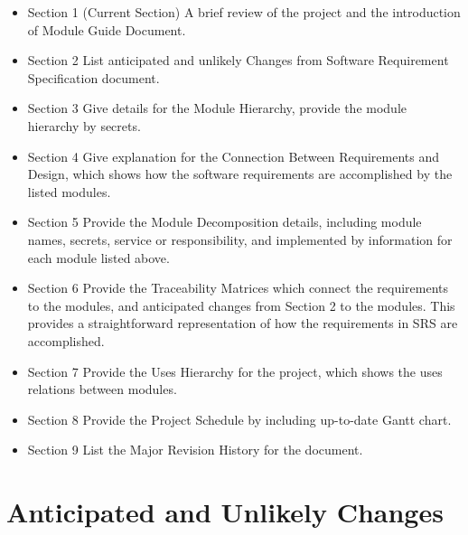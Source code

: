 \documentclass[12,english]{article}
\begin{document}
\begin{itemize}

\item Section 1 \newline (Current Section) A brief review of the project and the introduction of Module Guide Document.

\item Section 2 \newline List anticipated and unlikely Changes from Software Requirement Specification document. 

\item Section 3 \newline Give details for the Module Hierarchy, provide the module hierarchy by secrets. 

\item Section 4 \newline Give explanation for the Connection Between Requirements and Design, which shows how the software requirements are accomplished by the listed modules. 

\item Section 5 \newline Provide the Module Decomposition details, including module names, secrets, service or responsibility, and implemented by information for each module listed above. 

\item Section 6 \newline Provide the Traceability Matrices which connect the requirements to the modules, and anticipated changes from Section 2 to the modules. This provides a straightforward representation of how the requirements in SRS are accomplished.

\item Section 7 \newline Provide the Uses Hierarchy for the project, which shows the uses relations between modules.

\item Section 8 \newline Provide the Project Schedule by including up-to-date Gantt chart.

\item Section 9 \newline List the Major Revision History for the document.
\end{itemize}	

\section{Anticipated and Unlikely Changes}
\end{document}

